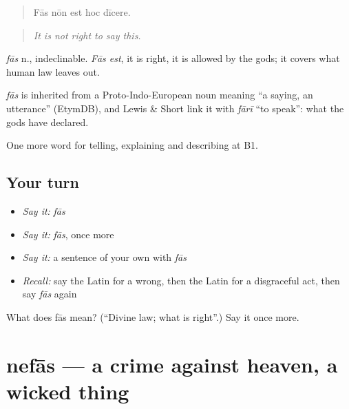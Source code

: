 \begin{quote}
Fās nōn est hoc dīcere.
\end{quote}

\begin{quote}
\emph{It is not right to say this.}
\end{quote}

\emph{fās} n., indeclinable. \emph{Fās est}, it is right, it is allowed by the gods; it covers what human law leaves out.

\begin{cousinweb}
\emph{fās} is inherited from a Proto-Indo-European noun meaning \textquotedblleft{}a saying, an utterance\textquotedblright{} (EtymDB), and Lewis \& Short link it with \emph{fārī} \textquotedblleft{}to speak\textquotedblright{}: what the gods have declared.
\end{cousinweb}

\begin{grammarlens}[title={What you've built}]
One more word for telling, explaining and describing at B1.
\end{grammarlens}

\subsection*{Your turn}
\begin{itemize}
\raggedright
  \item \emph{Say it:} \emph{fās}
  \item \emph{Say it:} \emph{fās}, once more
  \item \emph{Say it:} a sentence of your own with \emph{fās}
  \item \emph{Recall:} say the Latin for a wrong, then the Latin for a disgraceful act, then say \emph{fās} again
\end{itemize}

\begin{tcolorbox}[breakable,colback=teal!4,colframe=teal!35!black,title={Before you move on}]
What does fās mean? (\textquotedblleft{}Divine law; what is right\textquotedblright{}.) Say it once more.
\end{tcolorbox}
\section[nefās]{nefās — a crime against heaven, a wicked thing}

\label{lesson:LA-C414-nefas}



